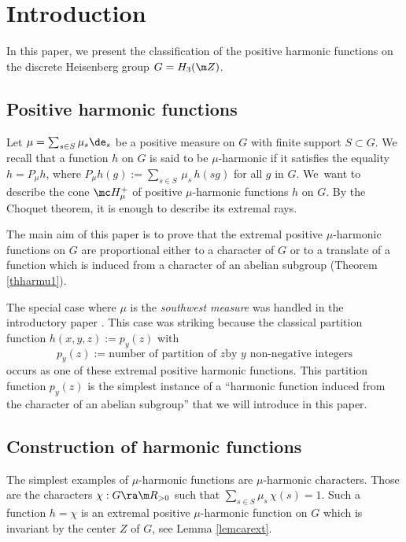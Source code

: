 \section{Introduction}

In this paper, we present the classification
of the positive harmonic functions
on the discrete Heisenberg group $G=H_3(\m Z)$.

\subsection{Positive harmonic functions}

Let $\mu=\sum_{s\in S} \mu_s \de_s$ be a positive measure on $G$
with finite support $S\subset G$.
We recall that a function $h$ on $G$ is said to be $\mu$-harmonic
if it satisfies the equality
$h= P_\mu h$, where $P_\mu h(g):= \sum_{s\in S} \,\mu_s\, h(sg)$ for all $g$ in $G$.
We~want to describe the cone $\mc H_\mu^+$ of positive $\mu$-harmonic functions $h$ on $G$.
By the Choquet theorem, it is enough to describe its extremal rays.

The main aim of this paper is to prove
that the extremal positive $\mu$-harmonic functions
on $G$ are proportional
either to a character of $G$ or to a translate of a function which is induced
from a character of an abelian subgroup (Theorem \ref{thharmu1}).

The special case
where $\mu$ is the {\it southwest measure} was handled in
the introductory paper
\cite{BenoistHeisenberg1}.
This case was striking because the classical partition
function $h(x,y,z):=p_y(z)$ with
\[
p_y(z):=
\text{number of partition of $z$
by $y$ non-negative integers}
\]
occurs as one of these extremal
positive harmonic functions.
This partition function $p_y(z)$ is the simplest instance
of a ``harmonic function induced
from the character of an abelian subgroup''
that we will introduce in this paper.

\subsection{Construction of harmonic functions}
\label{secincoha}
The simplest examples of $\mu$-harmonic functions are $\mu$-harmonic characters.
Those are the
characters
$\chi: G\ra \m R_{>0}$ such that $\sum_{s\in S}\mu_s\,\chi(s)=1$.
Such a function
$h=\chi$ is an
extremal positive $\mu$-harmonic function on $G$ which is invariant by the center $Z$ of $G$,
see Lemma \ref{lemcarext}.

